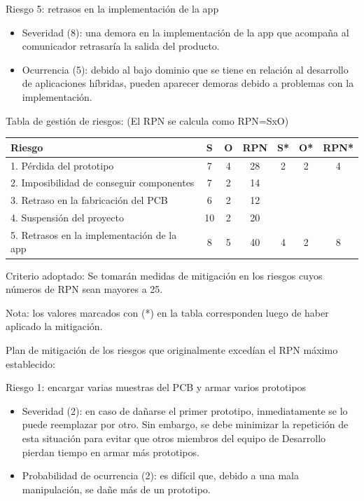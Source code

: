 \documentclass[
11pt, %
]{charter}
\begin{document}
Riesgo 5: retrasos en la implementación de la app
\begin{itemize}
	\item Severidad (8): una demora en la implementación de la app que acompaña al comunicador retrasaría la salida del producto.
	\item Ocurrencia (5): debido al bajo dominio que se tiene en relación al desarrollo de aplicaciones híbridas, pueden aparecer demoras debido a problemas con la implementación.
\end{itemize}


Tabla de gestión de riesgos:      (El RPN se calcula como RPN=SxO)

\begin{table}[htpb]
\centering
\begin{tabularx}{\linewidth}{@{}|X|c|c|c|c|c|c|@{}}
\hline
\rowcolor[HTML]{C0C0C0} 
Riesgo & S & O & RPN & S* & O* & RPN* \\ \hline
   1. Pérdida del prototipo    & 7  & 4  &  28   &  2  &  2  &   4   \\ \hline
   2. Imposibilidad de conseguir componentes   & 7  & 2  &  14   &    &    &      \\ \hline
   3. Retraso en la fabricación del PCB   & 6  & 2  &  12   &    &    &      \\ \hline
   4. Suspensión del proyecto   & 10  & 2  & 20   &    &    &      \\ \hline
   5. Retrasos en la implementación de la app   & 8  & 5  &  40   & 4   & 2   &  8    \\ \hline
\end{tabularx}%
\end{table}

Criterio adoptado: 
Se tomarán medidas de mitigación en los riesgos cuyos números de RPN sean mayores a 25.

Nota: los valores marcados con (*) en la tabla corresponden luego de haber aplicado la mitigación.

Plan de mitigación de los riesgos que originalmente excedían el RPN máximo establecido:
 
Riesgo 1: encargar varias muestras del PCB y armar varios prototipos
\begin{itemize}
  \item Severidad (2): en caso de dañarse el primer prototipo, inmediatamente se lo puede reemplazar por otro. Sin embargo, se debe minimizar la repetición de esta situación para evitar que otros miembros del equipo de Desarrollo pierdan tiempo en armar más prototipos.
  \item Probabilidad de ocurrencia (2): es difícil que, debido a una mala manipulación, se dañe más de un prototipo.
\end{itemize}
\end{document}
